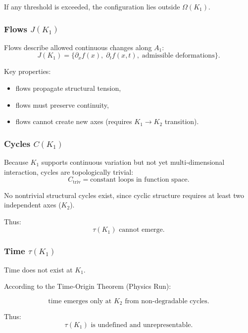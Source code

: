 If any threshold is exceeded, the configuration lies outside
$\Omega(K_1)$.

\subsubsection{Flows \texorpdfstring{$J(K_1)$}{J(K_1)}}

Flows describe allowed continuous changes along $A_1$:
\[
J(K_1) = \{ \partial_x f(x),\; \partial_t f(x,t),\; \text{admissible deformations} \}.
\]

Key properties:
\begin{itemize}
    \item flows propagate structural tension,
    \item flows must preserve continuity,
    \item flows cannot create new axes (requires $K_1\to K_2$ transition).
\end{itemize}

\subsubsection{Cycles \texorpdfstring{$C(K_1)$}{C(K_1)}}

Because $K_1$ supports continuous variation but not yet multi-dimensional
interaction, cycles are topologically trivial:
\[
C_{\mathrm{triv}} = \text{constant loops in function space}.
\]

No nontrivial structural cycles exist, since cyclic structure requires
at least two independent axes ($K_2$).

Thus:
\[
\tau(K_1) \text{ cannot emerge.}
\]

\subsubsection{Time \texorpdfstring{$\tau(K_1)$}{\tau(K_1)}}

Time does not exist at $K_1$.

According to the Time-Origin Theorem (Physics Run):

\[
\text{time emerges only at } K_2 \text{ from non-degradable cycles}.
\]

Thus:
\[
\tau(K_1) \text{ is undefined and unrepresentable.}
\]

